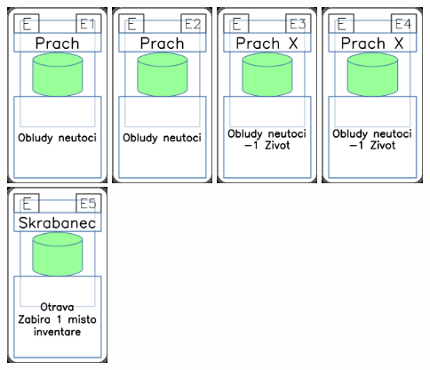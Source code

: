\documentclass[a4paper]{article}
\begin{document}
	\includegraphics[width=3.0cm]{img-4_50}
	\includegraphics[width=3.0cm]{img-4_51}
	\includegraphics[width=3.0cm]{img-4_52}
	\includegraphics[width=3.0cm]{img-4_53}
	\includegraphics[width=3.0cm]{img-4_54}
\end{document}
